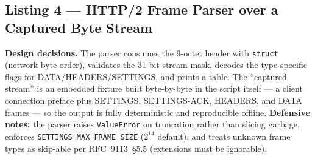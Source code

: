 \subsection{Listing 4 --- HTTP/2 Frame Parser over a Captured Byte Stream}

\textbf{Design decisions.} The parser consumes the 9-octet header with \texttt{struct} (network byte order), validates the 31-bit stream mask, decodes the type-specific flags for DATA/HEADERS/SETTINGS, and prints a table. The ``captured stream'' is an embedded fixture built byte-by-byte in the script itself --- a client connection preface plus SETTINGS, SETTINGS-ACK, HEADERS, and DATA frames --- so the output is fully deterministic and reproducible offline. \textbf{Defensive notes:} the parser raises \texttt{ValueError} on truncation rather than slicing garbage, enforces \texttt{SETTINGS\_MAX\_FRAME\_SIZE} ($2^{14}$ default), and treats unknown frame types as skip-able per RFC~9113~\S5.5 (extensions must be ignorable).

